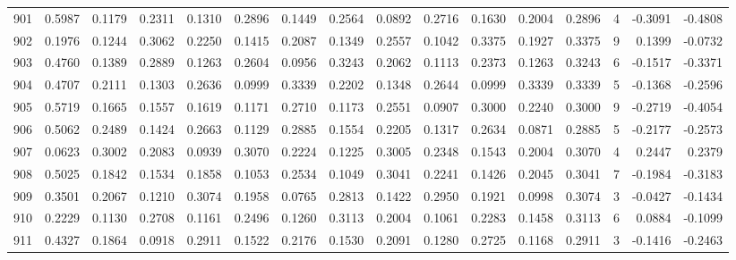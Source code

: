 \begin{tabular}{lrrrrrrrrrrrrrrr}
901 &      0.5987 &  0.1179 &  0.2311 &  0.1310 &  0.2896 &  0.1449 &  0.2564 &  0.0892 &  0.2716 &  0.1630 &   0.2004 &     0.2896 &      4 &                   -0.3091 &                    -0.4808 \\
902 &      0.1976 &  0.1244 &  0.3062 &  0.2250 &  0.1415 &  0.2087 &  0.1349 &  0.2557 &  0.1042 &  0.3375 &   0.1927 &     0.3375 &      9 &                    0.1399 &                    -0.0732 \\
903 &      0.4760 &  0.1389 &  0.2889 &  0.1263 &  0.2604 &  0.0956 &  0.3243 &  0.2062 &  0.1113 &  0.2373 &   0.1263 &     0.3243 &      6 &                   -0.1517 &                    -0.3371 \\
904 &      0.4707 &  0.2111 &  0.1303 &  0.2636 &  0.0999 &  0.3339 &  0.2202 &  0.1348 &  0.2644 &  0.0999 &   0.3339 &     0.3339 &      5 &                   -0.1368 &                    -0.2596 \\
905 &      0.5719 &  0.1665 &  0.1557 &  0.1619 &  0.1171 &  0.2710 &  0.1173 &  0.2551 &  0.0907 &  0.3000 &   0.2240 &     0.3000 &      9 &                   -0.2719 &                    -0.4054 \\
906 &      0.5062 &  0.2489 &  0.1424 &  0.2663 &  0.1129 &  0.2885 &  0.1554 &  0.2205 &  0.1317 &  0.2634 &   0.0871 &     0.2885 &      5 &                   -0.2177 &                    -0.2573 \\
907 &      0.0623 &  0.3002 &  0.2083 &  0.0939 &  0.3070 &  0.2224 &  0.1225 &  0.3005 &  0.2348 &  0.1543 &   0.2004 &     0.3070 &      4 &                    0.2447 &                     0.2379 \\
908 &      0.5025 &  0.1842 &  0.1534 &  0.1858 &  0.1053 &  0.2534 &  0.1049 &  0.3041 &  0.2241 &  0.1426 &   0.2045 &     0.3041 &      7 &                   -0.1984 &                    -0.3183 \\
909 &      0.3501 &  0.2067 &  0.1210 &  0.3074 &  0.1958 &  0.0765 &  0.2813 &  0.1422 &  0.2950 &  0.1921 &   0.0998 &     0.3074 &      3 &                   -0.0427 &                    -0.1434 \\
910 &      0.2229 &  0.1130 &  0.2708 &  0.1161 &  0.2496 &  0.1260 &  0.3113 &  0.2004 &  0.1061 &  0.2283 &   0.1458 &     0.3113 &      6 &                    0.0884 &                    -0.1099 \\
911 &      0.4327 &  0.1864 &  0.0918 &  0.2911 &  0.1522 &  0.2176 &  0.1530 &  0.2091 &  0.1280 &  0.2725 &   0.1168 &     0.2911 &      3 &                   -0.1416 &                    -0.2463 \\

\end{tabular}
